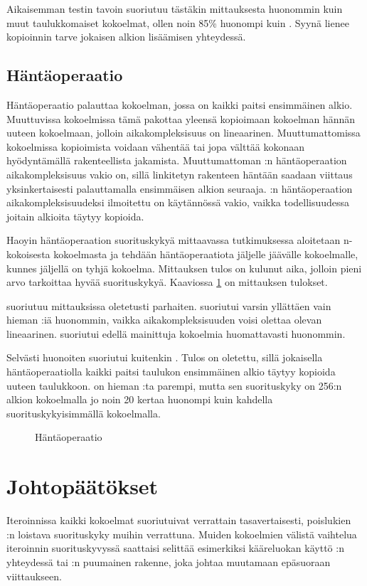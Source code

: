 Aikaisemman testin tavoin  suoriutuu tästäkin mittauksesta huonommin kuin muut taulukkomaiset kokoelmat, ollen noin 85\% huonompi kuin . Syynä lienee kopioinnin tarve jokaisen alkion lisäämisen yhteydessä.


\subsection{Häntäoperaatio}
Häntäoperaatio palauttaa kokoelman, jossa on kaikki paitsi ensimmäinen alkio. Muuttuvissa kokoelmissa tämä pakottaa yleensä kopioimaan kokoelman hännän uuteen kokoelmaan, jolloin aikakompleksisuus on lineaarinen. Muuttumattomissa kokoelmissa kopioimista voidaan vähentää tai jopa välttää kokonaan hyödyntämällä rakenteellista jakamista. Muuttumattoman :n häntäoperaation aikakompleksisuus vakio on, sillä linkitetyn rakenteen häntään saadaan viittaus yksinkertaisesti palauttamalla ensimmäisen alkion seuraaja. :n häntäoperaation aikakompleksisuudeksi ilmoitettu on käytännössä vakio\cite{scalaCollections}, vaikka todellisuudessa joitain alkioita täytyy kopioida.

Haoyin\cite{haoyiBenchmark} häntäoperaation suorituskykyä mittaavassa tutkimuksessa aloitetaan n-kokoisesta kokoelmasta ja tehdään häntäoperaatiota jäljelle jäävälle kokoelmalle, kunnes jäljellä on tyhjä kokoelma. Mittauksen tulos on kulunut aika, jolloin pieni arvo tarkoittaa hyvää suorituskykyä. Kaaviossa \ref{hantaoperaatio_kaavio} on mittauksen tulokset.

 suoriutuu mittauksissa oletetusti parhaiten.  suoriutui varsin yllättäen vain hieman :iä huonommin, vaikka aikakompleksisuuden voisi olettaa olevan lineaarinen.  suoriutui edellä mainittuja kokoelmia huomattavasti huonommin.

Selvästi huonoiten suoriutui kuitenkin . Tulos on oletettu, sillä jokaisella häntäoperaatiolla kaikki paitsi taulukon ensimmäinen alkio täytyy kopioida uuteen taulukkoon.  on hieman :ta parempi, mutta sen suorituskyky on 256:n alkion kokoelmalla jo noin 20 kertaa huonompi kuin kahdella suorituskykyisimmällä kokoelmalla.

\begin{figure}[h]
    \centering
    
    \caption{Häntäoperaatio}\label{hantaoperaatio_kaavio}
\end{figure}


\section{Johtopäätökset}
Iteroinnissa kaikki kokoelmat suoriutuivat verrattain tasavertaisesti, poislukien \\:n loistava suorituskyky muihin verrattuna. Muiden kokoelmien välistä vaihtelua iteroinnin suorituskyvyssä saattaisi selittää esimerkiksi kääreluokan käyttö :n yhteydessä tai :n puumainen rakenne, joka johtaa muutamaan epäsuoraan viittaukseen.

